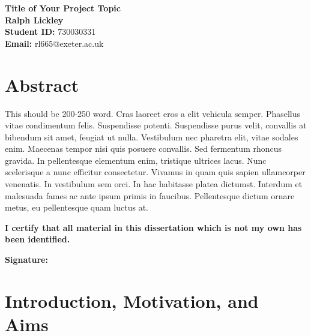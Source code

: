\documentclass[11pt,a4paper]{article}
\begin{document}
\singlespacing  %
\thispagestyle{empty} %

\begin{center}
    {\bf \LARGE Title of Your Project Topic}\\[0.5cm]
    \textbf{Ralph Lickley} \\[0.2cm]
    \textbf{Student ID:} 730030331 \\[1cm]
    \textbf{Email:} rl665@exeter.ac.uk \\[1cm]
\end{center}

\section*{Abstract}

\noindent
This should be 200-250 word.
Cras laoreet eros a elit vehicula semper. Phasellus vitae condimentum felis. Suspendisse potenti. Suspendisse purus velit, convallis at bibendum sit amet, feugiat ut nulla. Vestibulum nec pharetra elit, vitae sodales enim. Maecenas tempor nisi quis posuere convallis. Sed fermentum rhoncus gravida. In pellentesque elementum enim, tristique ultrices lacus. Nunc scelerisque a nunc efficitur consectetur. Vivamus in quam quis sapien ullamcorper venenatis. In vestibulum sem orci. In hac habitasse platea dictumst. Interdum et malesuada fames ac ante ipsum primis in faucibus. Pellentesque dictum ornare metus, eu pellentesque quam luctus at.

\vspace*{\fill}

\begin{checkbox}
    \item {\bf I certify that all material in this dissertation which is not my own has been identified.}
\end{checkbox}

\vspace{1em}
{\bf\noindent Signature:} \hrulefill
\newpage

\tableofcontents
\thispagestyle{empty}
\newpage

\clearpage

\section{Introduction, Motivation, and Aims}
\end{document}
